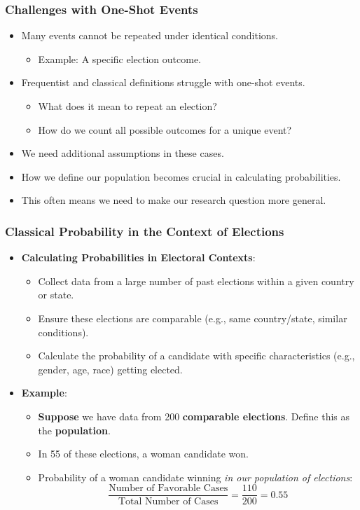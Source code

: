 \documentclass[handout]{beamer} %
\begin{document}
\begin{frame}
\frametitle{Challenges with One-Shot Events}
\begin{itemize}
    \item Many events cannot be repeated under identical conditions. \pause
    \begin{itemize}
        \item Example: A specific election outcome. \pause
    \end{itemize}
    \item Frequentist and classical definitions struggle with one-shot events. \pause
    \begin{itemize}
        \item What does it mean to repeat an election? \pause
        \item How do we count all possible outcomes for a unique event? \pause
    \end{itemize}
    \item We need additional assumptions in these cases. \pause
    \item How we define our population becomes crucial in calculating probabilities. \pause
    \item This often means we need to make our research question more general.
\end{itemize}
\end{frame}

\begin{frame}
\frametitle{Classical Probability in the Context of Elections}
\begin{itemize}
    \item \textbf{Calculating Probabilities in Electoral Contexts}: \pause
    \begin{itemize}
        \item Collect data from a large number of past elections within a given country or state. \pause
        \item Ensure these elections are comparable (e.g., same country/state, similar conditions). \pause
        \item Calculate the probability of a candidate with specific characteristics (e.g., gender, age, race) getting elected. \pause
    \end{itemize}
    \item \textbf{Example}: \pause
    \begin{itemize}
        \item \textbf{Suppose} we have data from 200 \textbf{comparable elections}. Define this as the \textbf{population}. \pause
        \item In 55 of these elections, a woman candidate won. \pause
        \item Probability of a woman candidate winning \emph{in our population of elections}:  \pause
        \[
        \frac{\text{Number of Favorable Cases}}{\text{Total Number of Cases}} = \frac{110}{200} = 0.55
        \]
    \end{itemize}
\end{itemize}
\end{frame}
\end{document}
